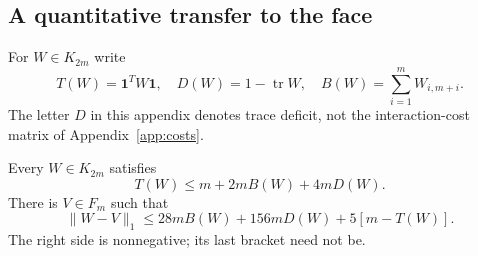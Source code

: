 \subsection{A quantitative transfer to the face}

For $W\in K_{2m}$ write
\[
 T(W)=\mathbf1^TW\mathbf1,\quad D(W)=1-\operatorname{tr}W,
 \quad B(W)=\sum_{i=1}^mW_{i,m+i}.
\]
The letter $D$ in this appendix denotes trace deficit, not the
interaction-cost matrix of Appendix~\ref{app:costs}.

\begin{lemma}\label{app:face-rounding}
Every $W\in K_{2m}$ satisfies
\begin{equation}
 T(W)\le m+2mB(W)+4mD(W).\label{app:exposure}
\end{equation}
There is $V\in F_m$ such that
\begin{equation}
 \|W-V\|_1\le28mB(W)+156mD(W)+5[m-T(W)].
 \label{app:face-distance}
\end{equation}
The right side is nonnegative; its last bracket need not be.
\end{lemma}
